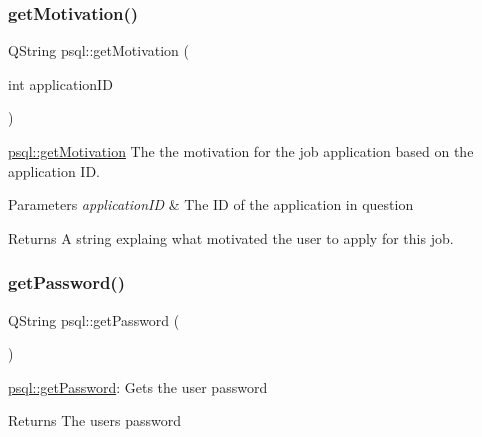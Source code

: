 \subsubsection{\texorpdfstring{get\+Motivation()}{getMotivation()}}
{\footnotesize\ttfamily Q\+String psql\+::get\+Motivation (\begin{DoxyParamCaption}\item[{int}]{application\+ID }\end{DoxyParamCaption})}



\mbox{\hyperlink{classpsql_aca1b2273937491e113089c1547caf49b}{psql\+::get\+Motivation}} The the motivation for the job application based on the application ID. 


\begin{DoxyParams}{Parameters}
{\em application\+ID} & The ID of the application in question \\
\hline
\end{DoxyParams}
\begin{DoxyReturn}{Returns}
A string explaing what motivated the user to apply for this job. 
\end{DoxyReturn}
\mbox{\label{classpsql_a817e5a88f877cac6f843c1e743aec096}} 
\subsubsection{\texorpdfstring{get\+Password()}{getPassword()}}
{\footnotesize\ttfamily Q\+String psql\+::get\+Password (\begin{DoxyParamCaption}{ }\end{DoxyParamCaption})}



\mbox{\hyperlink{classpsql_a817e5a88f877cac6f843c1e743aec096}{psql\+::get\+Password}}\+: Gets the user password 

\begin{DoxyReturn}{Returns}
The user\textquotesingle{}s password 
\end{DoxyReturn}
\mbox{\label{classpsql_ab6edb8a2e42d8ac7c4ae29f5b0cb494f}} 
